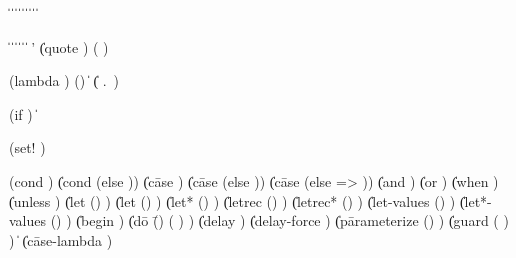\begin{grammar}%
 \: 
\>  \| 
\>  \| 
\>  \| 
\>  \| 
\>  \| 
\>  \| 
\>  \| 
\>  \| 
\>  \| 

 \:  \| 
 \:  \|  \| 
\>  \|  \|  \| 
 \: ' \| (quote )
 \: ( )
 \: 
 \: 

 \: (lambda  )
 \: () \| 
\>  \| ( .\ )
 \:   
 \:  
 \: 

 \: (if   )
 \: 
 \: 
 \:  \| 

 \: (set!  )

 \:
\>  \> (cond )
\>  \| (cond  (else ))
\>  \| (c\=ase 
\>       \>)
\>  \| (c\=ase 
\>       \>
\>       \>(else ))
\>  \| (c\=ase 
\>       \>
\>       \>(else => ))
\>  \| (and )
\>  \| (or )
\>  \| (when  )
\>  \| (unless  )
\>  \| (let () )
\>  \| (let  () )
\>  \| (let* () )
\>  \| (letrec () )
\>  \| (letrec* () )
\>  \| (let-values () )
\>  \| (let*-values () )
\>  \| (begin )
\>  \| (d\=o \=()
\>       \>  \>( )
\>       \>)
\>  \| (delay )
\>  \| (delay-force )
\>  \| (p\=arameterize ()
\>       \> )
\>  \| (guard ( ) )
\>  \| 
\>  \| (c\=ase-lambda )


\end{grammar}
